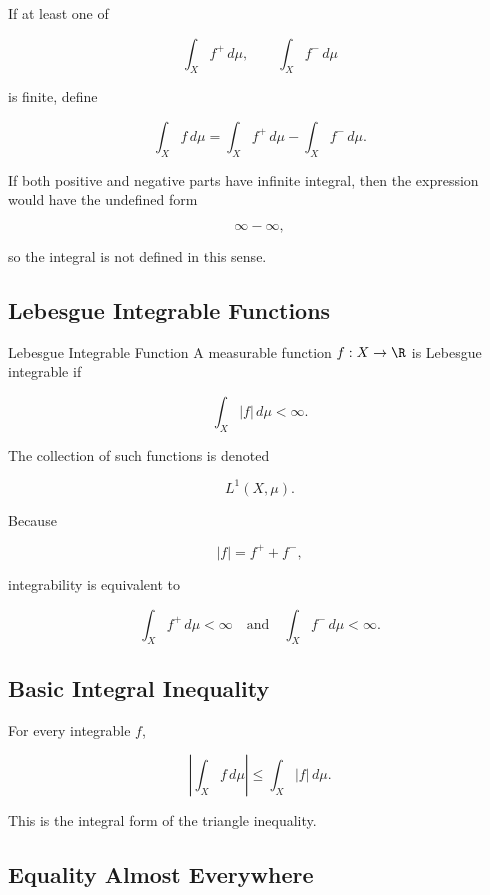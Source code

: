 If at least one of

\[
\int_Xf^+\,d\mu,
\qquad
\int_Xf^-\,d\mu
\]

is finite, define

\[
\boxed{
\int_Xf\,d\mu
=
\int_Xf^+\,d\mu
-
\int_Xf^-\,d\mu.
}
\]

If both positive and negative parts have infinite integral, then the
expression would have the undefined form

\[
\infty-\infty,
\]

so the integral is not defined in this sense.

\subsection{Lebesgue Integrable Functions}
\label{subsec:lebesgue-integrable-functions}

\begin{definitionbox}{Lebesgue Integrable Function}
A measurable function \(f:X\to\R\) is Lebesgue integrable if

\[
\boxed{
\int_X|f|\,d\mu<\infty.
}
\]

The collection of such functions is denoted

\[
\boxed{
L^1(X,\mu).
}
\]
\end{definitionbox}

Because

\[
|f|=f^++f^-,
\]

integrability is equivalent to

\[
\boxed{
\int_Xf^+\,d\mu<\infty
\quad\text{and}\quad
\int_Xf^-\,d\mu<\infty.
}
\]

\subsection{Basic Integral Inequality}
\label{subsec:basic-integral-inequality}

For every integrable \(f\),

\[
\boxed{
\left|
\int_Xf\,d\mu
\right|
\leq
\int_X|f|\,d\mu.
}
\]

This is the integral form of the triangle inequality.

\subsection{Equality Almost Everywhere}
\label{subsec:equality-ae-integration}

